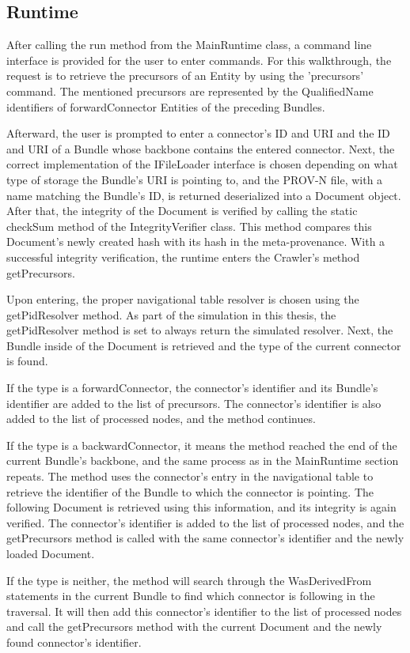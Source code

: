 \documentclass[
  digital,     %
  oneside,     %
  nosansbold,  %
  nocolorbold, %
  lof,         %
  lot,         %
]{fithesis4}
\begin{document}
\subsection{Runtime}
After calling the run method from the MainRuntime class, a command line interface is provided for the user to enter commands. For this walkthrough, the request is to retrieve the precursors of an Entity by using the 'precursors' command. The mentioned precursors are represented by the QualifiedName identifiers of forwardConnector Entities of the preceding Bundles.
 
Afterward, the user is prompted to enter a connector's ID and URI and the ID and URI of a Bundle whose backbone contains the entered connector. Next, the correct implementation of the IFileLoader interface is chosen depending on what type of storage the Bundle's URI is pointing to, and the PROV-N file, with a name matching the Bundle's ID, is returned deserialized into a Document object. After that, the integrity of the Document is verified by calling the static checkSum method of the IntegrityVerifier class. This method compares this Document's newly created hash with its hash in the meta-provenance. With a successful integrity verification, the runtime enters the Crawler's method getPrecursors.

Upon entering, the proper navigational table resolver is chosen using the getPidResolver method. As part of the simulation in this thesis, the getPidResolver method is set to always return the simulated resolver. Next, the Bundle inside of the Document is retrieved and the type of the current connector is found. 

If the type is a forwardConnector, the connector's identifier and its Bundle's identifier are added to the list of precursors. The connector's identifier is also added to the list of processed nodes, and the method continues. 

If the type is a backwardConnector, it means the method reached the end of the current Bundle's backbone, and the same process as in the MainRuntime section repeats. The method uses the connector's entry in the navigational table to retrieve the identifier of the Bundle to which the connector is pointing. The following Document is retrieved using this information, and its integrity is again verified. The connector's identifier is added to the list of processed nodes, and the getPrecursors method is called with the same connector's identifier and the newly loaded Document. 

If the type is neither, the method will search through the WasDerivedFrom statements in the current Bundle to find which connector is following in the traversal. It will then add this connector's identifier to the list of processed nodes and call the getPrecursors method with the current Document and the newly found connector's identifier. 
\end{document}
